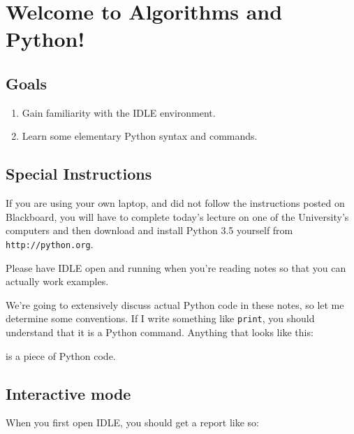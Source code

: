 \documentclass[m3380-lec-main.tex]{subfiles}
\begin{document}
\chapter{Welcome to Algorithms and Python!}

\section*{Goals}
\begin{enumerate}[1.~]\setlength{\itemsep}{0pt}
\item Gain familiarity with the IDLE environment.
\item Learn some elementary Python syntax and commands.
\end{enumerate}

\section*{Special Instructions}
If you are using your own laptop, and did not follow the instructions posted on Blackboard, you will have to complete today's lecture on one of the University's computers and then download and install Python 3.5 yourself from \verb|http://python.org|.\bigskip

Please have IDLE open and running when you're reading notes so that you can actually work examples.\bigskip

We're going to extensively discuss actual Python code in these notes, so let me determine some conventions. If I write something like \verb|print|, you should understand that it is a Python command. Anything that looks like this:

\smallskip\noindent
is a piece of Python code.

\section{Interactive mode} When you first open IDLE, you should get a report like so:

\smallskip\noindent
\end{document}
